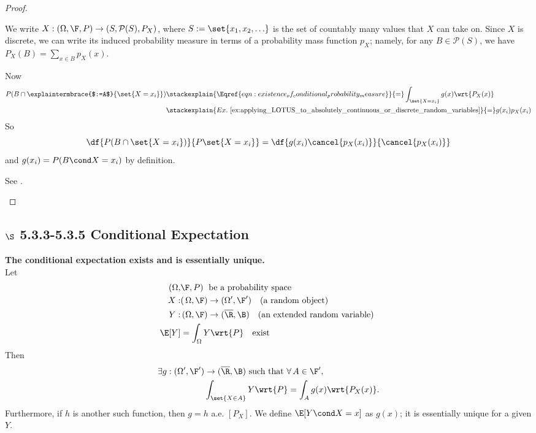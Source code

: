 \documentclass{article} %
\begin{document}
\begin{proof}
\begin{alphabate}
\item   We write $X: (\Omega, \F, P) \to (S, \mathcal{P}(S), P_X)$, where $S := \set{x_1, x_2,\hdots}$ is the set of countably many values that $X$ can take on. Since $X$ is discrete, we can write its induced probability measure in terms of a probability mass function $p_X$; namely, for any $B \in  \mathcal{P}(S)$, we have $P_X(B) = \sum_{x \in B} p_X(x)$. 

Now
\begin{align}
P(B \cap \explaintermbrace{$:=A$}{\set{X=x_i}}) &\stackexplain{\Eqref{eqn:existence_of_conditional_probability_measure}}{=} \int_{ \set{X=x_i}} g(x) \wrt{P_X(x)} \\
& \stackexplain{Ex.~\ref{ex:applying_LOTUS_to_absolutely_continuous_or_discrete_random_variables}}{=} g(x_i) p_X(x_i) 
\end{align}
So 
\[ \df{P(B \cap \set{X=x_i}) }{P\set{X=x_i}} = \df{g(x_i) \cancel{p_X(x_i)}}{\cancel{p_X(x_i)}} \]
and $g(x_i) = P(B \cond X=x_i)$ by definition.
%	
\item See \cite[pp.206-208]{ash2000probability}.
\end{alphabate}	
\end{proof}


\subsection{$\S$ 5.3.3-5.3.5 Conditional Expectation}

\begin{theorem}\textbf{The conditional expectation exists and is essentially unique.} \\
Let
\begin{align*}
(\Omega, &\F, P) \; \text{ be a probability space}	\\
X : & (\, \Omega, \F) \to (\Omega', \F')  \quad \text{(a random object) }\\
Y : & \, (\Omega, \F) \to (\overline{\R}, \B) \quad \text{(an extended random variable) }\\
\E[Y] & = \int_\Omega Y \wrt{P} \quad \text{exist}
\end{align*}
Then 
\begin{align*}
\exists g : (\Omega', \F')   & \to (\overline{\R}, \B) \text{ such that }\forall \, A \in \F',\\
&\int_{\set{X \in A}} Y \wrt{P} = \int_A g(x) \wrt{P_X(x)}.
\end{align*}
Furthermore, if $h$ is another such function, then $g=h$ a.e. $[P_X]$.  We define $\E[Y \cond X = x]$ as $g(x)$; it is essentially unique for a given $Y$.
\label{thm:existence_of_conditional_expectation}
\end{theorem}
\end{document}
